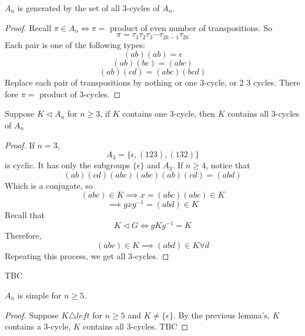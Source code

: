 \documentclass[openany]{report}
\begin{document}
\begin{lemma}
    $A_n$ is generated by the set of all 3-cycles of $A_n$.
\end{lemma}
\begin{proof}
    Recall $\pi \in A_n \iff \pi = $ product of even number of transpositions. So 
    $$\pi = \tau_1\tau_2\tau_3\cdots\tau_{2k-1}\tau_{2k}$$ 
    Each pair is one of the following types: 
    \[(ab)(ab) = \epsilon\]
    \[(ab)(bc) = (abc)\]
    \[(ab)(cd) = (abc)(bcd)\]
    Replace each pair of transpositions by nothing or one 3-cycle, or 2 3 cycles. There fore $\pi = $ product of 3-cycles.
\end{proof}

\begin{lemma}
    Suppose $K \triangleleft A_n$ for $n \geq 3$, if $K$ contains one 3-cycle, then $K$ contains all 3-cycles of $A_n$
\end{lemma}

\begin{proof}
    If $n = 3$, 
    \[A_3 = \{\epsilon, (123), (132)\}\]
    is cyclic. It has only the subgroups $\{\epsilon\}$ and $A_3$. If $n \geq 4$, notice that 
    \[(ab)(cd)(abc)(abc)(ab)(cd) = (abd)\]
    Which is a conjugate, so 
    \[(abc) \in K \implies x = (abc)(abc) \in K\]
    \[\implies gxg^{-1} = (abd) \in K\]
    Recall that 
    \[K \triangleleft G \iff gKg^{-1} = K \]
    Therefore,
    \[(abc) \in K \implies (abd) \in K \forall d\]
    Repeating this process, we get all 3-cycles. 
\end{proof}

\begin{lemma}
    TBC
\end{lemma}

\begin{theorem}
    $A_n$ is simple for $n \geq 5$.
\end{theorem}
\begin{proof}
    Suppose $K \triangle left$ for $n \geq 5$ and $K \neq \{\epsilon\}$. By the previous lemma's, $K$ contains a 3-cycle, $K$ contains all 3-cycles. TBC
\end{proof}
\end{document}
